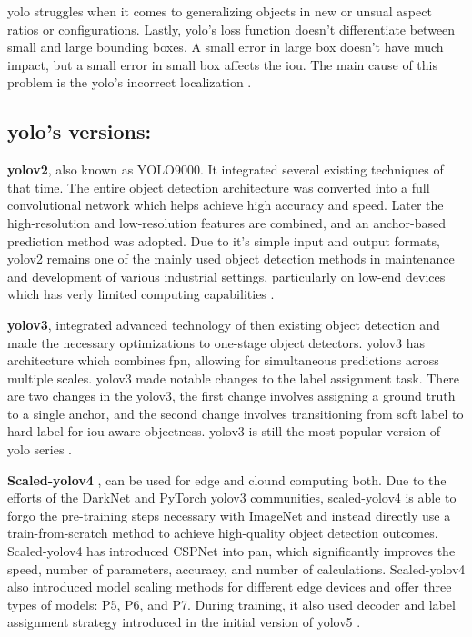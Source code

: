 \gls{yolo} struggles when it comes to generalizing objects in new or unsual aspect ratios or configurations. Lastly, \gls{yolo}'s loss function doesn't differentiate between small and large bounding boxes. A small error in large box doesn't have much impact, but a small error in small box affects the \gls{iou}. The main cause of this problem is the \gls{yolo}'s incorrect localization \cite{redmon2016you}.

\subsection*{\gls{yolo}'s versions: }

\textbf{\gls{yolo}v2}\cite{redmon2017yolo9000}, also known as YOLO9000. It integrated several existing techniques of that time. The entire object detection architecture was converted into a full convolutional network which helps achieve high accuracy and speed. Later the high-resolution and low-resolution features are combined, and an anchor-based prediction method was adopted. Due to it's simple input and output  formats, \gls{yolo}v2 remains one of the mainly used object detection methods in maintenance and development of various industrial settings, particularly on low-end devices which has verly limited computing capabilities \cite{wang2024yolov1}.

\textbf{\gls{yolo}v3}\cite{redmon2018yolov3}, integrated advanced technology of then existing object detection and made the necessary optimizations to one-stage object detectors. \gls{yolo}v3 has architecture which combines \gls{fpn}, allowing for simultaneous predictions across multiple scales. \gls{yolo}v3 made notable changes to the label assignment task. There are two changes in the \gls{yolo}v3, the first change involves assigning a ground truth to a single anchor, and the second change involves transitioning from soft label to hard label for \gls{iou}-aware objectness. \gls{yolo}v3 is still the most popular version of \gls{yolo} series \cite{wang2024yolov1}.

\textbf{Scaled-\gls{yolo}v4} \cite{wang2021scaled}, can be used for edge and clound computing both. Due to the efforts of the DarkNet and PyTorch \gls{yolo}v3 communities, scaled-\gls{yolo}v4 is able to forgo the pre-training steps necessary with ImageNet and instead directly use a train-from-scratch method to achieve high-quality object detection outcomes. Scaled-\gls{yolo}v4 has introduced CSPNet into \gls{pan}, which significantly improves the speed, number of parameters, accuracy, and number of calculations. Scaled-\gls{yolo}v4 also introduced model scaling methods for different edge devices and offer three types of models: P5, P6, and P7. During training, it also used decoder and label assignment strategy introduced in the initial version of \gls{yolo}v5 \cite{wang2024yolov1}.

